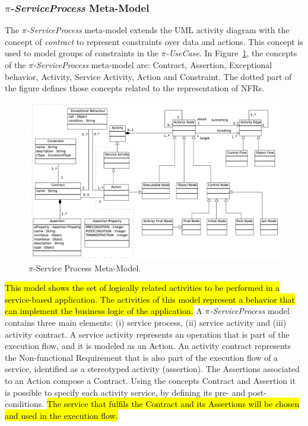 \documentclass{singlecol-new}
\theoremstyle{TH}{
\newtheorem{lemma}{Lemma}
\newtheorem{theorem}[lemma]{Theorem}
\newtheorem{corrolary}[lemma]{Corrolary}
\newtheorem{conjecture}[lemma]{Conjecture}
\newtheorem{proposition}[lemma]{Proposition}
\newtheorem{claim}[lemma]{Claim}
\newtheorem{stheorem}[lemma]{Wrong Theorem}
\newtheorem{algorithm}{Algorithm}
}
\theoremstyle{THrm}{
\newtheorem{definition}{Definition}[section]
\newtheorem{question}{Question}[section]
\newtheorem{remark}{Remark}
\newtheorem{scheme}{Scheme}
}
\theoremstyle{THhit}{
\newtheorem{case}{Case}[section]
}
\theoremstyle{THhsl}{
\newtheorem{example}{Example}
}
\begin{document}
\subsubsection{\textit{$\pi$-ServiceProcess} Meta-Model}

The \textit{$\pi$-ServiceProcess} meta-model extends the UML activity diagram with the concept of \textit{contract} to represent constraints over data and actions. This concept is used to model
groups  of  constraints  in the \textit{$\pi$-UseCase}.
In Figure~\ref{fig:CIM:serviceprocessmetamodel}, the concepts of the \textit{$\pi$-Ser\-vice\-Process} meta-model are: {\sc Contract}, {\sc Assertion}, {\sc Exceptional behavior}, {\sc Activity}, {\sc Ser\-vice Acti\-vi\-ty}, {\sc Action} and {\sc Constraint}.
The dotted part of the figure defines those concepts related to the representation of NFRs.

\begin{figure}[h]
\center
\includegraphics[width=1\textwidth]{./figures/ServiceProcessMetaModel.pdf}
\caption{\label{fig:CIM:serviceprocessmetamodel} $\pi$-Service Process Meta-Model.}
\end{figure}

\hl{This model shows the set of logically related activities to be performed in a service-based application.
The activities of this model represent a behavior that can  implement the business logic of the application.}
A \textit{$\pi$-ServiceProcess}  model contains three main elements: (i) service process, (ii) service activity and (iii) activity contract. A service activity represents an operation that is part of the execution flow, and it is modeled as an {\sc Action}.
An activity contract represents the {\sc Non-functional Requirement}  that is also part of the execution flow of a service, identified  as a stereotyped activity ({\sf assertion}).
The {\sc Assertion}s associated to an {\sc Action} compose a {\sc Contract}. 
Using the concepts {\sc Contract} and {\sc Assertion} it is possible to specify each activity service, by defining its pre- and post-conditions. \hl{The service that fulfils the {\sc Contract} and its {\sc Assertions} will be chosen and used in the execution flow.}
\end{document}
